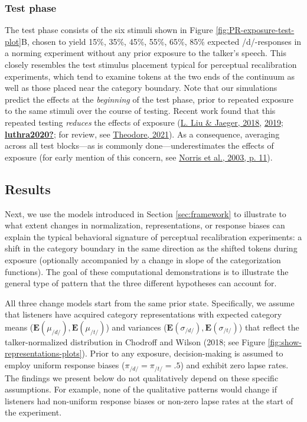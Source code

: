\documentclass[
  11pt,
  english,
  man,floatsintext]{apa6}
\begin{document}
\hypertarget{test-phase}{%
\subsubsection{Test phase}\label{test-phase}}

The test phase consists of the six stimuli shown in Figure \ref{fig:PR-exposure-test-plot}B, chosen to yield 15\%, 35\%, 45\%, 55\%, 65\%, 85\% expected /d/-responses in a norming experiment without any prior exposure to the talker's speech. This closely resembles the test stimulus placement typical for perceptual recalibration experiments, which tend to examine tokens at the two ends of the continuum as well as those placed near the category boundary. Note that our simulations predict the effects at the \emph{beginning} of the test phase, prior to repeated exposure to the same stimuli over the course of testing. Recent work found that this repeated testing \emph{reduces} the effects of exposure (\protect\hyperlink{ref-liu-jaeger2018}{L. Liu \& Jaeger, 2018}, \protect\hyperlink{ref-liu-jaeger2019}{2019}; \protect\hyperlink{ref-luthra2020}{\textbf{luthra2020?}}; for review, see \protect\hyperlink{ref-theodore2021}{Theodore, 2021}). As a consequence, averaging across all test blocks---as is commonly done---underestimates the effects of exposure (for early mention of this concern, see \protect\hyperlink{ref-norris2003}{Norris et al., 2003, p. 11}).

\hypertarget{results}{%
\subsection{Results}\label{results}}

Next, we use the models introduced in Section \ref{sec:framework} to illustrate to what extent changes in normalization, representations, or response biases can explain the typical behavioral signature of perceptual recalibration experiments: a shift in the category boundary in the same direction as the shifted tokens during exposure (optionally accompanied by a change in slope of the categorization functions). The goal of these computational demonstrations is to illustrate the general type of pattern that the three different hypotheses can account for.

All three change models start from the same prior state. Specifically, we assume that listeners have acquired category representations with expected category means (\(\mathbf{E}(\mu_{/d/}), \mathbf{E}(\mu_{/t/})\)) and variances (\(\mathbf{E}(\sigma_{/d/}), \mathbf{E}(\sigma_{/t/})\)) that reflect the talker-normalized distribution in Chodroff and Wilson (2018; see Figure \ref{fig:show-representations-plots}). Prior to any exposure, decision-making is assumed to employ uniform response biases (\(\pi_{/d/}=\pi_{/t/}=.5\)) and exhibit zero lapse rates. The findings we present below do not qualitatively depend on these specific assumptions. For example, none of the qualitative patterns would change if listeners had non-uniform response biases or non-zero lapse rates at the start of the experiment.
\end{document}
